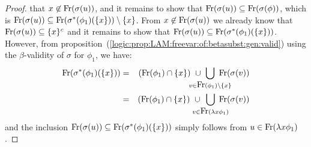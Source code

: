 \begin{proof}
    that $x\not\in\mbox{\rm Fr}(\sigma(u))$, and it remains to show that 
    $\mbox{\rm Fr}(\sigma(u))\subseteq\mbox{\rm Fr}(\sigma(\phi))$, which is
    $\mbox{\rm Fr}(\sigma(u))\subseteq\mbox{\rm Fr}(\sigma^{*}(\phi_{1})(\{x\}))\setminus\{x\}$.
    From $x\not\in\mbox{\rm Fr}(\sigma(u))$ we already know that 
    $\mbox{\rm Fr}(\sigma(u))\subseteq\{x\}^{c}$ and it remains to show that
    $\mbox{\rm Fr}(\sigma(u))\subseteq\mbox{\rm Fr}(\sigma^{*}(\phi_{1})(\{x\}))$. However, from 
    proposition~(\ref{logic:prop:LAM:freevar:of:betasubst:gen:valid}) using the 
    $\beta$-validity of $\sigma$ for $\phi_{1}$, we have:
    \begin{eqnarray*}
        \free(\sigma^{*}(\phi_{1})(\{x\}))
        &=&(\free(\phi_{1})\cap\{x\})
        \ \cup\ 
        \!\!\!\!\!\!\!\!\!\!\!\!
        \bigcup_{v\in\free(\phi_{1})\setminus\{x\}} 
        \!\!\!\!\!\!\!\!\!\!
        \free(\sigma(v))\\
        &=&(\free(\phi_{1})\cap\{x\})
        \ \cup\ 
        \!\!\!\!\!\!\!\!\!
        \bigcup_{v\in\free(\lambda x\phi_{1})} 
        \!\!\!\!\!\!\!\!
        \free(\sigma(v))
    \end{eqnarray*}
    and the inclusion 
    $\mbox{\rm Fr}(\sigma(u))\subseteq\mbox{\rm Fr}(\sigma^{*}(\phi_{1})(\{x\}))$ simply
    follows from $u\in\mbox{\rm Fr}(\lambda x\phi_{1})$.
\end{proof}

